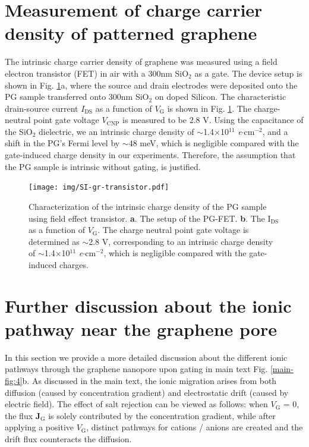\documentclass[manuscript=suppinfo,email=true, hyperref=true, keywords=false]{achemso}
\newcommand{\Fig}{Fig.}
\begin{document}
\section{Measurement of charge carrier density of patterned graphene}
\label{sec:charge-dens}
The intrinsic charge carrier density of graphene was measured using a
field electron transistor (FET) in air with a 300nm SiO$_2$ as a
gate. The device setup is shown in \Fig{} \ref{fig:charge-dens}a,
where the source and drain electrodes were deposited onto the PG
sample transferred onto 300nm SiO$_2$ on doped Silicon. The
characteristic drain-source current $I_{\mathrm{DS}}$ as a function of
$V_{\mathrm{G}}$ is shown in \Fig{} \ref{fig:charge-dens}. The
charge-neutral point gate voltage $V_{\mathrm{CNP}}$ is measured to be 2.8 V.
Using the capacitance of the SiO$_{2}$ dielectric, we an intrinsic
charge density of $\sim{}$1.4$\times$10$^{11}$
\textit{e}$\cdot$cm$^{-2}$, and a shift in the PG's Fermi level by
$\sim{}$48 meV, which is negligible compared with the gate-induced
charge density in our experiments. Therefore, the assumption that the
PG sample is intrinsic without gating, is justified.

\begin{figure}[htbp]
  \centering
  \texttt{[image: img/SI-gr-transistor.pdf]}
  \caption{Characterization of the intrinsic charge density of the PG
    sample using field effect transistor. \textbf{a}. The setup of the
    PG-FET. \textbf{b}. The I$_{\mathrm{DS}}$ as a function of
    $V_{\mathrm{G}}$. The charge neutral point gate voltage is
    determined as $\sim{}$2.8 V, corresponding to an intrinsic charge
    density of $\sim{}$1.4$\times$10$^{11}$
    \textit{e}$\cdot$cm$^{-2}$, which is negligible compared with the
    gate-induced charges.}
  \label{fig:charge-dens}
\end{figure}

\pagebreak

\section{Further discussion about the ionic pathway near the graphene pore}
\label{sec:conc}

In this section we provide a more detailed discussion about the
different ionic pathways through the graphene nanopore upon gating in
main text \Fig{} \ref{main-fig:4}b. As discussed in the main text, the
ionic migration arises from both diffusion (caused by
concentration gradient) and electrostatic drift (caused by electric
field).  The effect of salt rejection can be viewed as follows: when
$V_{\mathrm{G}}$ = 0, the flux $\boldsymbol{J}_{\mathrm{G}}$ is solely
contributed by the concentration gradient, while after applying a
positive $V_{\mathrm{G}}$, distinct pathways for cations /
anions are created and the drift flux counteracts the diffusion.
\end{document}
